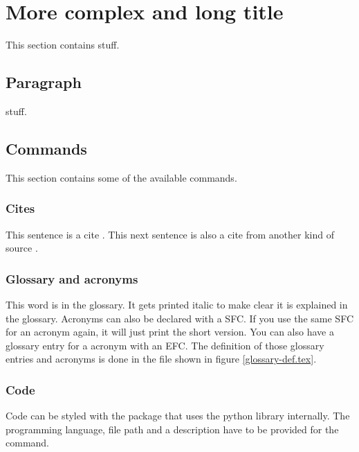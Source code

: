 \section[Header Title]{More complex and long title}
\label{chap:HeaderTitle}

This section contains stuff.
\subsection{Paragraph}
stuff.


\subsection{Commands}
This section contains some of the available commands.

\subsubsection{Cites}
This sentence is a cite \cite{google:mobile-first}. This next sentence is also a cite from another kind of source \cite{idc:stuff}.

\subsubsection{Glossary and acronyms}
This \gls{word} is in the glossary. It gets printed italic to make clear it is explained in the glossary. Acronyms can also be declared with a \gls{SFC}. If you use the same \gls{SFC} for an acronym again, it will just print the short version. You can also have a glossary entry for a acronym with an \gls{EFC}. The definition of those glossary entries and acronyms is done in the  file shown in figure \ref{glossary-def.tex}.
\breakit
{}

\subsubsection{Code}

Code can be styled with the  package that uses the python library  internally. The programming language, file path and a description have to be provided for the  command.
